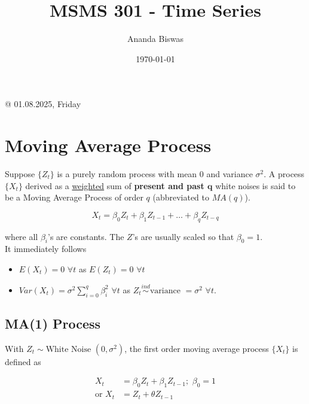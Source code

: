 \documentclass[11pt, a4paper]{article}
\title{MSMS 301 - Time Series}
\author{Ananda Biswas}
\date{\today}
\begin{document}
\maketitle

\tableofcontents

\newpage

\begin{flushright}
\textcolor{col2}{@ 01.08.2025, Friday}
\end{flushright}

\section{Moving Average Process}

Suppose $\{Z_t\}$ is a purely random process with mean $0$ and variance $\sigma^2$. A process $\{X_t\}$ derived as a \underline{weighted} sum of \textcolor{col1}{\textbf{present and past $\mathbf{q}$}} white noises is said to be a Moving Average Process of order $q$ (abbreviated to $MA(q)$).

\begin{equation}\label{maq}
X_t = \beta_0 Z_t + \beta_1 Z_{t-1} + \ldots + \beta_q Z_{t-q}
\end{equation}

where all $\beta_i$'s are constants. The $Z$'s are usually scaled so that $\beta_0 = 1$. \\[0.5em]

It immediately follows

\begin{itemize}
\item $E(X_t) = 0$ $\forall t$ as $E(Z_t) = 0$ $\forall t$

\item $Var(X_t) = \sigma^2 \sum \limits_{i = 0}^{q} \beta_{i}^{2}$ $\forall t$ as $Z_t \overset{ind}{\sim} \text{variance } = \sigma^2$ $\forall t$.
\end{itemize}

\subsection{MA(1) Process}

With $Z_t \sim \text{White Noise }(0, \sigma^2)$, the first order moving average process $\{X_t\}$ is defined as

\begin{align}
X_t &= \beta_0 Z_t + \beta_1 Z_{t-1}; \,\, \beta_0 = 1 \\[0.25em]
\text{or } X_t &= Z_t + \theta Z_{t-1}
\end{align}
\end{document}

